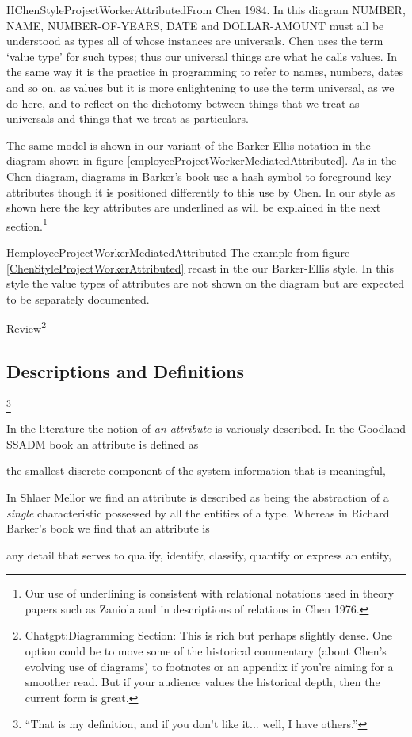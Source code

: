 \begin{erboxedFigure} {H}{ChenStyleProjectWorkerAttributed}{From Chen 1984. In this diagram NUMBER, NAME, NUMBER-OF-YEARS, DATE and DOLLAR-AMOUNT must all be understood as types all of whose instances are universals. Chen uses the term `value type' for such types;
thus our universal things are what he calls values. In the same way it is 
the practice in programming to refer to names, numbers, dates and so on, as values but it is more enlightening to use  the term universal, as we do here, and to reflect on  the dichotomy between things that we treat as universals and things that we treat as particulars. }

\end{erboxedFigure}

The same model is shown in our variant of the Barker-Ellis notation
 in the diagram shown in figure \ref{employeeProjectWorkerMediatedAttributed}.
As in the Chen diagram, diagrams in Barker's book use a hash symbol to foreground key attributes though it  is positioned differently to this use by Chen. In our style as shown here the key attributes are underlined as will be explained in the next section.\footnote{Our use of underlining is consistent with relational notations used in theory papers such as Zaniola and in descriptions of relations in Chen 1976.}
\begin{erboxedFigure} {H}{employeeProjectWorkerMediatedAttributed}
{The example from figure \ref{ChenStyleProjectWorkerAttributed} recast in the our Barker-Ellis style. 
In this style the value types of attributes are not shown on the diagram but are expected to be 
separately documented. }

\end{erboxedFigure}

Review\footnote{Chatgpt:Diagramming Section:
This is rich but perhaps slightly dense. One option could be to move some of the historical commentary (about Chen’s evolving use of diagrams) to footnotes or an appendix if you’re aiming for a smoother read. But if your audience values the historical depth, then the current form is great.}


\subsection{Descriptions and Definitions}\footnote{“That is my definition, and if you don’t like it... well, I have others.”}

\mynote
In the literature the notion of \textit{an attribute} is variously described.
In the Goodland SSADM book an attribute is defined as
\begin{erquote}
  the smallest discrete component of the system information that is meaningful,
\end{erquote}
In  Shlaer Mellor we find an attribute is described as being
the abstraction of a \textit{single} characteristic possessed by all the entities
of a type. Whereas in Richard Barker's book we find that an attribute is 
\begin{erquote}
any detail that serves to qualify, identify, classify, quantify or express an  entity,
\end{erquote}

